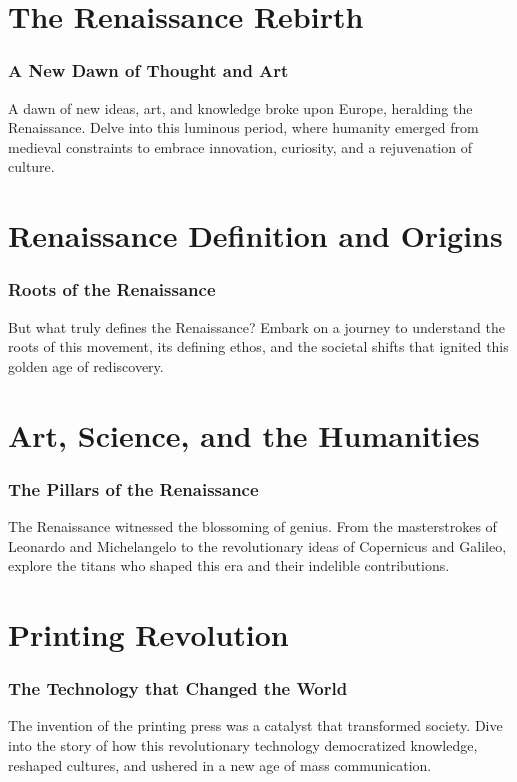 \documentclass[a4paper,12pt]{book}
\begin{document}
\chapter{The Renaissance Rebirth}
\subsection*{A New Dawn of Thought and Art}
A dawn of new ideas, art, and knowledge broke upon Europe, heralding the Renaissance. Delve into this luminous period, where humanity emerged from medieval constraints to embrace innovation, curiosity, and a rejuvenation of culture.

\chapter{Renaissance Definition and Origins}
\subsection*{Roots of the Renaissance}
But what truly defines the Renaissance? Embark on a journey to understand the roots of this movement, its defining ethos, and the societal shifts that ignited this golden age of rediscovery.

\chapter{Art, Science, and the Humanities}
\subsection*{The Pillars of the Renaissance}
The Renaissance witnessed the blossoming of genius. From the masterstrokes of Leonardo and Michelangelo to the revolutionary ideas of Copernicus and Galileo, explore the titans who shaped this era and their indelible contributions.

\chapter{Printing Revolution}
\subsection*{The Technology that Changed the World}
The invention of the printing press was a catalyst that transformed society. Dive into the story of how this revolutionary technology democratized knowledge, reshaped cultures, and ushered in a new age of mass communication.
\end{document}
